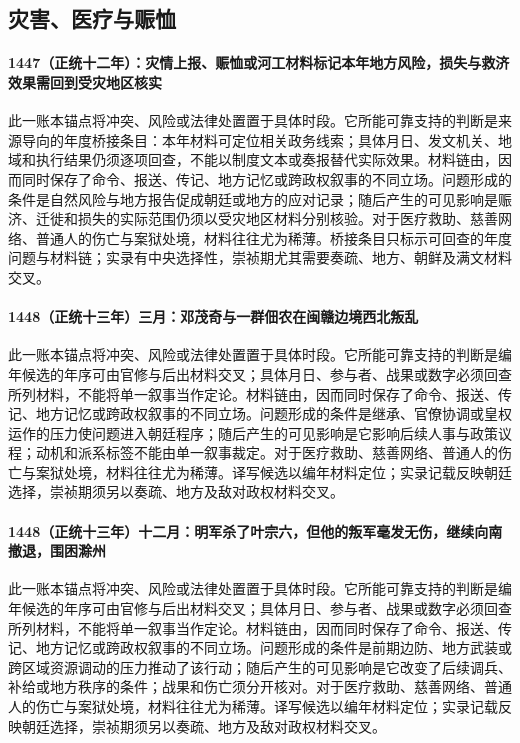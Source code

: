 \subsection{灾害、医疗与赈恤}

\paragraph{1447（正统十二年）：灾情上报、赈恤或河工材料标记本年地方风险，损失与救济效果需回到受灾地区核实} 此一账本锚点将冲突、风险或法律处置置于具体时段。它所能可靠支持的判断是来源导向的年度桥接条目：本年材料可定位相关政务线索；具体月日、发文机关、地域和执行结果仍须逐项回查，不能以制度文本或奏报替代实际效果。材料链由，因而同时保存了命令、报送、传记、地方记忆或跨政权叙事的不同立场。问题形成的条件是自然风险与地方报告促成朝廷或地方的应对记录；随后产生的可见影响是赈济、迁徙和损失的实际范围仍须以受灾地区材料分别核验。对于医疗救助、慈善网络、普通人的伤亡与案狱处境，材料往往尤为稀薄。桥接条目只标示可回查的年度问题与材料链；实录有中央选择性，崇祯期尤其需要奏疏、地方、朝鲜及满文材料交叉。

\paragraph{1448（正统十三年）三月：邓茂奇与一群佃农在闽赣边境西北叛乱} 此一账本锚点将冲突、风险或法律处置置于具体时段。它所能可靠支持的判断是编年候选的年序可由官修与后出材料交叉；具体月日、参与者、战果或数字必须回查所列材料，不能将单一叙事当作定论。材料链由，因而同时保存了命令、报送、传记、地方记忆或跨政权叙事的不同立场。问题形成的条件是继承、官僚协调或皇权运作的压力使问题进入朝廷程序；随后产生的可见影响是它影响后续人事与政策议程；动机和派系标签不能由单一叙事裁定。对于医疗救助、慈善网络、普通人的伤亡与案狱处境，材料往往尤为稀薄。译写候选以编年材料定位；实录记载反映朝廷选择，崇祯期须另以奏疏、地方及敌对政权材料交叉。

\paragraph{1448（正统十三年）十二月：明军杀了叶宗六，但他的叛军毫发无伤，继续向南撤退，围困滁州} 此一账本锚点将冲突、风险或法律处置置于具体时段。它所能可靠支持的判断是编年候选的年序可由官修与后出材料交叉；具体月日、参与者、战果或数字必须回查所列材料，不能将单一叙事当作定论。材料链由，因而同时保存了命令、报送、传记、地方记忆或跨政权叙事的不同立场。问题形成的条件是前期边防、地方武装或跨区域资源调动的压力推动了该行动；随后产生的可见影响是它改变了后续调兵、补给或地方秩序的条件；战果和伤亡须分开核对。对于医疗救助、慈善网络、普通人的伤亡与案狱处境，材料往往尤为稀薄。译写候选以编年材料定位；实录记载反映朝廷选择，崇祯期须另以奏疏、地方及敌对政权材料交叉。


